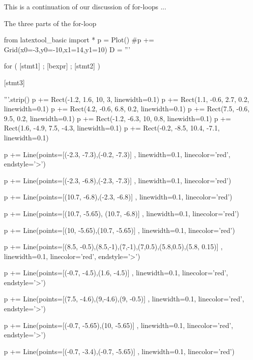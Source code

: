 \newpage{}

This is a continuation of our discussion of for-loops ...

The three parts of the for-loop
\begin{python}
from latextool_basic import *
p = Plot()
#p += Grid(x0=-3,y0=-10,x1=14,y1=10)
D = '''





for ( [stmt1] ;         [bexpr]   ;    [stmt2]  )










            [stmt3]







'''.strip()
p += Rect(-1.2, 1.6, 10, 3, linewidth=0.1)
p += Rect(1.1, -0.6, 2.7, 0.2, linewidth=0.1)
p += Rect(4.2, -0.6, 6.8, 0.2, linewidth=0.1)
p += Rect(7.5, -0.6, 9.5, 0.2, linewidth=0.1)
p += Rect(-1.2, -6.3, 10, 0.8, linewidth=0.1)
p += Rect(1.6, -4.9, 7.5, -4.3, linewidth=0.1)
p += Rect(-0.2, -8.5, 10.4, -7.1, linewidth=0.1)

p += Line(points=[(-2.3, -7.3),(-0.2, -7.3)] , linewidth=0.1, linecolor='red', endstyle='>')

p += Line(points=[(-2.3, -6.8),(-2.3, -7.3)] , linewidth=0.1, linecolor='red')

p += Line(points=[(10.7, -6.8),(-2.3, -6.8)] , linewidth=0.1, linecolor='red')

p += Line(points=[(10.7, -5.65), (10.7, -6.8)] , linewidth=0.1, linecolor='red')

p += Line(points=[(10, -5.65),(10.7, -5.65)] , linewidth=0.1, linecolor='red')

p += Line(points=[(8.5, -0.5),(8.5,-1),(7,-1),(7,0.5),(5.8,0.5),(5.8, 0.15)] , linewidth=0.1, linecolor='red', endstyle='>')

p += Line(points=[(-0.7, -4.5),(1.6, -4.5)] , linewidth=0.1, linecolor='red', endstyle='>')

p += Line(points=[(7.5, -4.6),(9,-4.6),(9, -0.5)] , linewidth=0.1, linecolor='red', endstyle='>')

p += Line(points=[(-0.7, -5.65),(10, -5.65)] , linewidth=0.1, linecolor='red', endstyle='>')

p += Line(points=[(-0.7, -3.4),(-0.7, -5.65)] , linewidth=0.1, linecolor='red')


\end{python}
